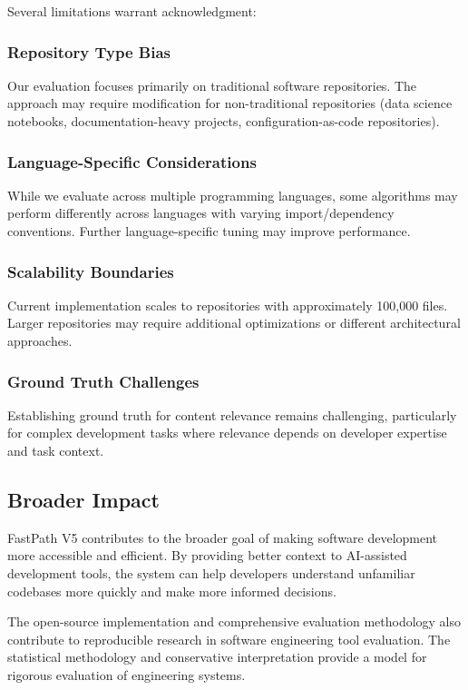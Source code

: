 \documentclass[conference]{IEEEtran}
\begin{document}
Several limitations warrant acknowledgment:

\subsubsection{Repository Type Bias}
Our evaluation focuses primarily on traditional software repositories. The approach may require modification for non-traditional repositories (data science notebooks, documentation-heavy projects, configuration-as-code repositories).

\subsubsection{Language-Specific Considerations}
While we evaluate across multiple programming languages, some algorithms may perform differently across languages with varying import/dependency conventions. Further language-specific tuning may improve performance.

\subsubsection{Scalability Boundaries}
Current implementation scales to repositories with approximately 100,000 files. Larger repositories may require additional optimizations or different architectural approaches.

\subsubsection{Ground Truth Challenges}
Establishing ground truth for content relevance remains challenging, particularly for complex development tasks where relevance depends on developer expertise and task context.

\subsection{Broader Impact}

FastPath V5 contributes to the broader goal of making software development more accessible and efficient. By providing better context to AI-assisted development tools, the system can help developers understand unfamiliar codebases more quickly and make more informed decisions.

The open-source implementation and comprehensive evaluation methodology also contribute to reproducible research in software engineering tool evaluation. The statistical methodology and conservative interpretation provide a model for rigorous evaluation of engineering systems.
\end{document}
